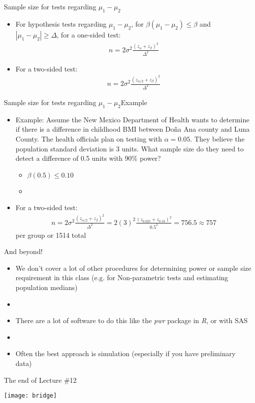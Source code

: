 \documentclass[xcolor=dvipsnames]{beamer}
\begin{document}
\begin{frame}{Sample size for tests regarding $\mu_1 - \mu_2$}
	\begin{itemize}
		\item For hypothesis tests regarding $\mu_1 - \mu_2$, for $\beta(\mu_1 - \mu_2) \leq \beta$ and $|\mu_1 - \mu_2|\geq \Delta$, for a one-sided test:
		\begin{gather*}
			n = 2 \sigma^2 \frac{(z_{\alpha} + z_{\beta})^2}{\Delta^2}
		\end{gather*}
		\item For a two-sided test:
		\begin{gather*}
		n = 2 \sigma^2 \frac{(z_{\alpha/2} + z_{\beta})^2}{\Delta^2}
		\end{gather*}
	\end{itemize}
\end{frame}

\begin{frame}{Sample size for tests regarding $\mu_1 - \mu_2$}{Example}
	\begin{itemize}
		\item Example: Assume the New Mexico Department of Health wants to determine if there is a difference in childhood BMI between Do\~{n}a Ana county and Luna County. The health officials plan on testing with $\alpha = 0.05$. They believe the population standard deviation is 3 units. What sample size do they need to detect a difference of 0.5 units with 90\% power?
		\begin{itemize}
			\item $\beta(0.5) \leq 0.10$
			\item[]
		\end{itemize}
		\item For a two-sided test:
		\begin{gather*}
		n = 2 \sigma^2 \frac{(z_{\alpha/2} + z_{\beta})^2}{\Delta^2} = 2 (3)^2 \frac{(z_{0.025} + z_{0.10})^2}{0.5^2} = 756.5 \approx 757
		\end{gather*}
		per group or 1514 total
	\end{itemize}
\end{frame}

\begin{frame}{And beyond!}
	\begin{itemize}
		\item We don't cover a lot of other procedures for determining power or sample size requirement in this class (e.g. for Non-parametric tests and estimating population medians)
		\item[] 
		\item There are a lot of software to do this like the \emph{pwr} package in \emph{R}, or with SAS 
		\item[]
		\item Often the best approach is simulation (especially if you have preliminary data)
	\end{itemize}
\end{frame}

\begin{frame}{The end of Lecture \#12}
	\begin{center}
		\texttt{[image: bridge]}
	\end{center}
\end{frame}
\end{document}
